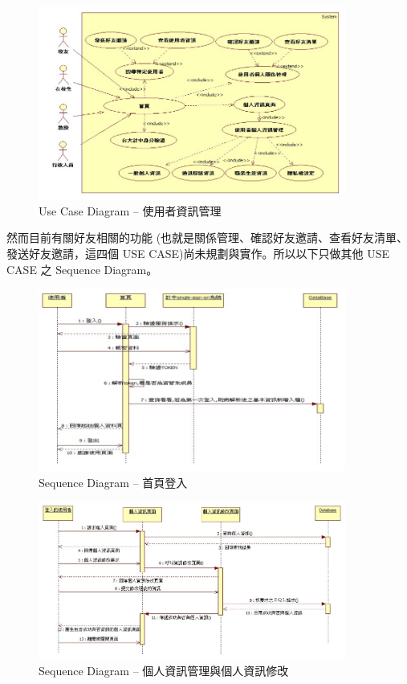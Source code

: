 \documentclass[11pt]{article}
\begin{document}
\begin{figure}[H]
\centering
\includegraphics[width=0.9\textwidth]{img/use01.png}
\caption{Use Case Diagram -- 使用者資訊管理}
\end{figure}

然而目前有關好友相關的功能 (也就是關係管理、確認好友邀請、查看好友清單、發送好友邀請，這四個 USE CASE)尚未規劃與實作。所以以下只做其他 USE CASE 之 Sequence Diagram。

\begin{figure}[H]
\centering
\includegraphics[width=0.9\textwidth]{img/seq01.png}
\caption{Sequence Diagram -- 首頁登入}
\end{figure}

\begin{figure}[H]
\centering
\includegraphics[width=0.9\textwidth]{img/seq02.png}
\caption{Sequence Diagram -- 個人資訊管理與個人資訊修改}
\end{figure}
\end{document}
